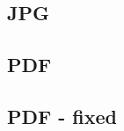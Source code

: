 \documentclass[11pt]{scrartcl}
\begin{document}
\subsection{JPG}
\begin{figure}[htbp]
   \centering
   \setlength{\fboxsep}{5pt}
   \setlength{\fboxrule}{2pt}
   \label{fig:Abb-3-19-jpg}
\end{figure}

\subsection{PDF}
\begin{figure}[htbp]
   \centering
   \setlength{\fboxsep}{5pt}
   \setlength{\fboxrule}{2pt}
   \label{fig:Abb-3-19-pdf}
\end{figure}

\subsection{PDF - fixed}
\begin{figure}[htbp]
   \centering
   \setlength{\fboxsep}{5pt}
   \setlength{\fboxrule}{2pt}
   \label{fig:Abb-3-19-pdf}
\end{figure}
\end{document}
